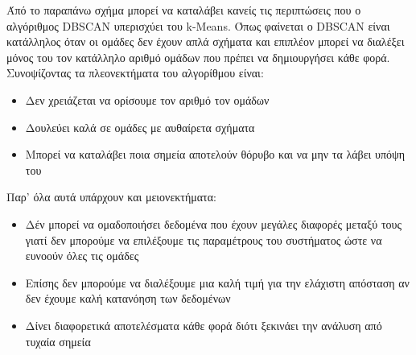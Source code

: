 Άπό το παραπάνω σχήμα μπορεί να καταλάβει κανείς τις περιπτώσεις που ο αλγόριθμος \textlatin{DBSCAN} υπερισχύει του \textlatin{k-Means}. Όπως φαίνεται ο \textlatin{DBSCAN} είναι κατάλληλος όταν
οι ομάδες δεν έχουν απλά σχήματα και επιπλέον μπορεί να διαλέξει μόνος του τον κατάλληλο αριθμό ομάδων που πρέπει να δημιουργήσει κάθε φορά. Συνοψίζοντας τα πλεονεκτήματα του αλγορίθμου
είναι\cite{dbscanadv}:
\begin{itemize}
    \item Δεν χρειάζεται να ορίσουμε τον αριθμό τον ομάδων
    \item Δουλεύει καλά σε ομάδες με αυθαίρετα σχήματα
    \item Μπορεί να καταλάβει ποια σημεία αποτελούν θόρυβο και να  μην τα λάβει υπόψη του
\end{itemize}
Παρ' όλα αυτά υπάρχουν και μειονεκτήματα:
\begin{itemize}
    \item Δέν μπορεί να ομαδοποιήσει δεδομένα που έχουν μεγάλες διαφορές μεταξύ τους γιατί δεν μπορούμε να επιλέξουμε τις παραμέτρους του συστήματος ώστε να ευνοούν όλες τις ομάδες
    \item Επίσης δεν μπορούμε να διαλέξουμε μια καλή τιμή για την ελάχιστη απόσταση αν δεν έχουμε καλή κατανόηση των δεδομένων
    \item Δίνει διαφορετικά αποτελέσματα κάθε φορά διότι ξεκινάει την ανάλυση από τυχαία σημεία
\end{itemize}
